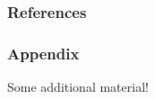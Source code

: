 \documentclass{beamer}
\begin{document}
\begin{frame}
  \frametitle{References}


  
  
\end{frame}

\appendix

\begin{frame}
\frametitle{Appendix}
  Some additional material!
\end{frame}
\end{document}

